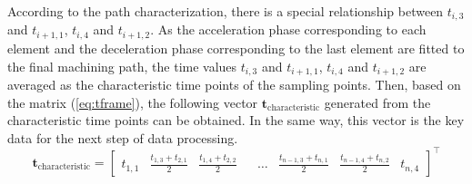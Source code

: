 According to the path characterization, there is a special relationship between $t_{i,3}$ and $t_{i+1,1}$, $t_{i,4}$ and $t_{i+1,2}$. As the acceleration phase corresponding to each element and the deceleration phase corresponding to the last element are fitted to the final machining path, the time values $t_{i,3}$ and $t_{i+1,1}$, $t_{i,4}$ and $t_{i+1,2}$ are averaged as the characteristic time points of the sampling points. Then, based on the matrix (\ref{eq:tframe}), the following vector $\boldsymbol{t_{\mathrm{characteristic}}}$ generated from the characteristic time points can be obtained. In the same way, this vector is the key data for the next step of data processing.
\begin{equation}
  \boldsymbol{t_{\mathrm{characteristic}}} =  \begin{bmatrix}
       t_{1,1} & \frac{t_{1,3}+t_{2,1}}{2} & \frac{t_{1,4}+t_{2,2}}{2} &  & \dots & \frac{t_{n-1,3}+t_{n,1}}{2} & \frac{t_{n-1,4}+t_{n,2}}{2} & t_{n,4} \end{bmatrix}^\top
       \label{eq:tcha}
\end{equation}
